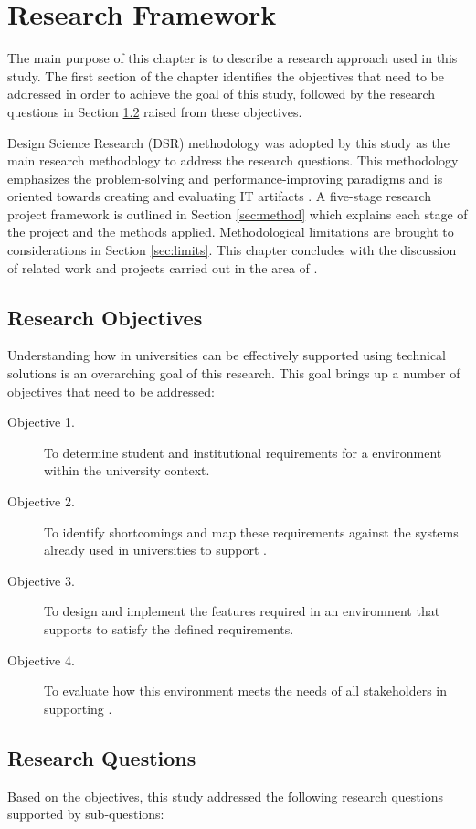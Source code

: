 \chapter{Research Framework\label{cha:method}}
The main purpose of this chapter is to describe a research approach used in this
study. The first section of the chapter identifies the objectives that need to
be addressed in order to achieve the goal of this study, followed by the research
questions in Section \ref{sec:questions} raised from these objectives.

Design Science Research (DSR) methodology was adopted by this study as the main
research methodology to address the research questions. This methodology
emphasizes the problem-solving and performance-improving paradigms and is
oriented towards creating and evaluating IT artifacts \citep{Hevner2004}. A
five-stage research project framework is outlined in Section \ref{sec:method}
which explains each stage of the project and the methods applied. Methodological
limitations are brought to considerations in Section \ref{sec:limits}. This
chapter concludes with the discussion of related work and projects carried out
in the area of \LLLsn.

\section{Research Objectives}

Understanding how \LLLs in universities can be effectively supported using
technical solutions is an overarching goal of this research. This goal brings up
a number of objectives that need to be addressed:
\begin{description}
  \item[Objective 1.] To determine student and institutional requirements for a
  \LLLs environment within the university context.
  \item[Objective 2.] To identify shortcomings and map these requirements
  against the systems already used in universities to support \LLLsn.
  \item[Objective 3.] To design and implement the features required in an
  environment that supports \LLLs to satisfy the defined requirements.
  \item[Objective 4.] To evaluate how this environment meets the needs of all
  stakeholders in supporting \LLLsn.
\end{description}

\section{Research Questions}
\label{sec:questions}
Based on the objectives, this study addressed the following research questions
supported by sub-questions:

